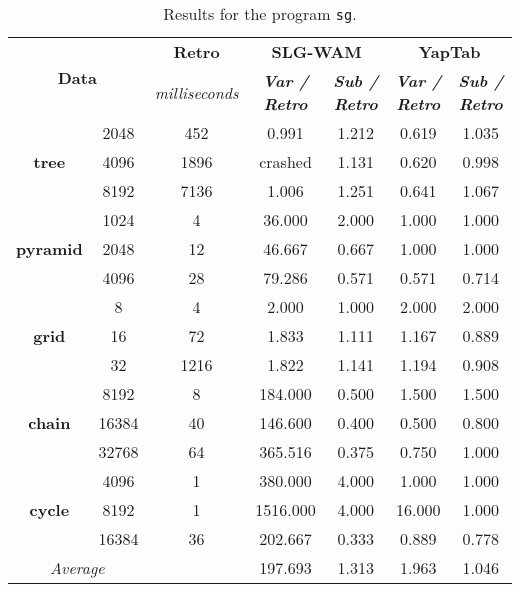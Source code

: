 \begin{table}[ht]
\centering
\footnotesize{
  \begin{tabular}{cc|c|cc|cc}
   \hline
    \hline
    \multicolumn{2}{c|}{\multirow{2}{*}{\small{\textbf{Data}}}} & \textbf{\small{Retro}} & \multicolumn{2}{c|}{\small{\textbf{SLG-WAM}}} & \multicolumn{2}{c}{\small{\textbf{YapTab}}} \\
     \multicolumn{2}{c|}{} & \scriptsize{\textit{milliseconds}} & \textbf{\textit{\scriptsize{Var / Retro}}} & \textbf{\textit{\scriptsize{Sub / Retro}}} & \textbf{\textit{\scriptsize{Var / Retro}}} & \textbf{\textit{\scriptsize{Sub / Retro}}} \\
   \hline
   \hline

\multirow{3}{*}{\textbf{tree}} &  2048 &  452 &  0.991  &  1.212  &  0.619 & 1.035 \\
&  4096 &  1896 &  \scriptsize{crashed}  &  1.131  &  0.620 & 0.998 \\
&  8192 &  7136 &  1.006  &  1.251  &  0.641 & 1.067 \\
\hline
\multirow{3}{*}{\textbf{pyramid}} &  1024 &  4 &  36.000  &  2.000  &  1.000 & 1.000 \\
&  2048 &  12 &  46.667  &  0.667  &  1.000 & 1.000 \\
&  4096 &  28 &  79.286  &  0.571  &  0.571 & 0.714 \\
\hline
\multirow{3}{*}{\textbf{grid}} &  8 &  4 &  2.000  &  1.000  &  2.000 & 2.000 \\
&  16 &  72 &  1.833  &  1.111  &  1.167 & 0.889 \\
&  32 &  1216 &  1.822  &  1.141  &  1.194 & 0.908 \\
\hline
\multirow{3}{*}{\textbf{chain}} &  8192 &  8 &  184.000  &  0.500  &  1.500 & 1.500 \\
&  16384 &  40 &  146.600  &  0.400  &  0.500 & 0.800 \\
&  32768 &  64 &  365.516  &  0.375  &  0.750 & 1.000 \\
\hline
\multirow{3}{*}{\textbf{cycle}} &  4096 &  1 &  380.000  &  4.000  &  1.000 & 1.000 \\
&  8192 &  1 &  1516.000  &  4.000  &  16.000 & 1.000 \\
&  16384 &  36 &  202.667  &  0.333  &  0.889 & 0.778 \\
\hline
\hline
\multicolumn{2}{c}{\textit{Average}} & & 197.693 & 1.313 & 1.963 & 1.046 \\ 
\hline
\hline
\end{tabular}
}
\caption{Results for the program \texttt{sg}.}
\label{tbl:prefix_sg}
\end{table}

